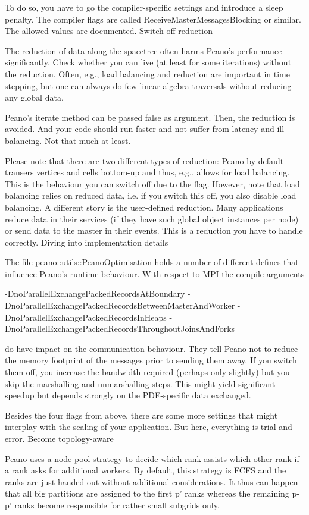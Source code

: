 To do so, you have to go the compiler-specific settings and introduce a sleep penalty. The compiler flags are called ReceiveMasterMessagesBlocking or similar. The allowed values are documented.
Switch off reduction

The reduction of data along the spacetree often harms Peano's performance significantly. Check whether you can live (at least for some iterations) without the reduction. Often, e.g., load balancing and reduction are important in time stepping, but one can always do few linear algebra traversals without reducing any global data.

Peano's iterate method can be passed false as argument. Then, the reduction is avoided. And your code should run faster and not suffer from latency and ill-balancing. Not that much at least.

Please note that there are two different types of reduction: Peano by default transers vertices and cells bottom-up and thus, e.g., allows for load balancing. This is the behaviour you can switch off due to the flag. However, note that load balancing relies on reduced data, i.e. if you switch this off, you also disable load balancing. A different story is the user-defined reduction. Many applications reduce data in their services (if they have such global object instances per node) or send data to the master in their events. This is a reduction you have to handle correctly.
Diving into implementation details

The file peano::utils::PeanoOptimisation holds a number of different defines that influence Peano's runtime behaviour. With respect to MPI the compile arguments

-DnoParallelExchangePackedRecordsAtBoundary
-DnoParallelExchangePackedRecordsBetweenMasterAndWorker
-DnoParallelExchangePackedRecordsInHeaps
-DnoParallelExchangePackedRecordsThroughoutJoinsAndForks

do have impact on the communication behaviour. They tell Peano not to reduce the memory footprint of the messages prior to sending them away. If you switch them off, you increase the bandwidth required (perhaps only slightly) but you skip the marshalling and unmarshalling steps. This might yield significant speedup but depends strongly on the PDE-specific data exchanged.

Besides the four flags from above, there are some more settings that might interplay with the scaling of your application. But here, everything is trial-and-error.
Become topology-aware

Peano uses a node pool strategy to decide which rank assists which other rank if a rank asks for additional workers. By default, this strategy is FCFS and the ranks are just handed out without additional considerations. It thus can happen that all big partitions are assigned to the first p' ranks whereas the remaining p-p' ranks become responsible for rather small subgrids only.

